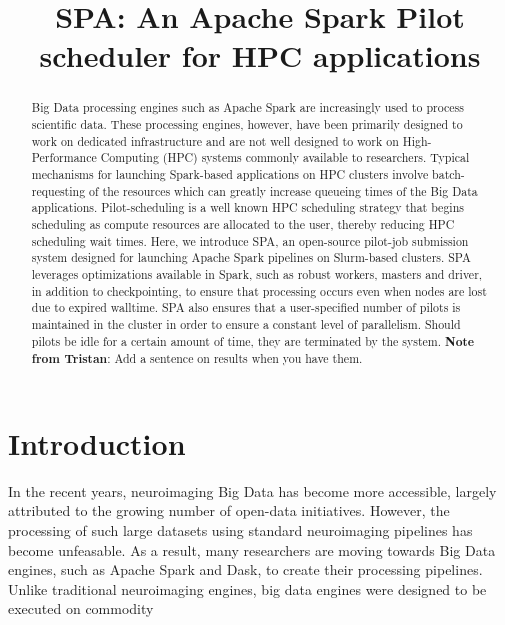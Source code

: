 \documentclass{IEEEtran}
\newcommand{\tristan}[1]{\color{red}\textbf{Note from Tristan}:
      #1 \color{black}}
\begin{document}
\title{SPA: An Apache Spark Pilot scheduler for HPC applications}
\author{
    \IEEEauthorblockA{}
}
\maketitle

\begin{abstract}
    Big Data processing engines such as Apache Spark are increasingly 
    used to process scientific data. These processing engines, however, 
    have been primarily designed to work on dedicated infrastructure 
    and are not well designed to work on High-Performance Computing 
    (HPC) systems commonly available to researchers. Typical mechanisms 
    for launching Spark-based applications on HPC clusters involve 
    batch-requesting of the resources which can greatly increase 
    queueing times of the Big Data 
    applications. Pilot-scheduling is a well known HPC scheduling
    strategy that begins scheduling as compute resources are allocated to the 
    user, thereby reducing HPC scheduling wait times. Here, we introduce SPA, an
    open-source
    pilot-job submission system designed for launching Apache Spark pipelines 
    on Slurm-based clusters. SPA leverages optimizations available in Spark, 
    such as robust workers, masters and driver, in addition to 
    checkpointing, to ensure that processing occurs even when nodes are 
    lost due to expired walltime. SPA also ensures that a 
    user-specified number of pilots is maintained in the cluster in 
    order to ensure a constant level of parallelism. Should pilots be 
    idle for a certain amount of time, they are terminated by 
    the system. \tristan{Add a sentence on results when you have them.}

\end{abstract}

\section{Introduction}

In the recent years, neuroimaging Big Data has become more accessible, largely 
attributed to the growing number of open-data initiatives. However, the
processing of such large datasets using standard neuroimaging pipelines has 
become unfeasable. As a result, many researchers are moving towards Big Data 
engines, such as Apache Spark and Dask, to create their processing pipelines. 
Unlike traditional neuroimaging engines, big data engines were designed to be 
executed on commodity 
\end{document}
